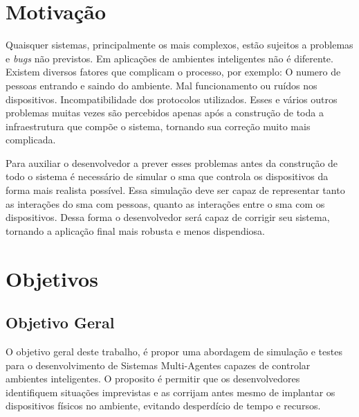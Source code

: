     
    
\section{Motivação}
\label{sec:motivacao}
 
    Quaisquer sistemas, principalmente os mais complexos, estão sujeitos a problemas e \emph{bugs} não previstos. Em aplicações de ambientes inteligentes não é diferente. Existem diversos fatores que complicam o processo, por exemplo: O numero de pessoas entrando e saindo do ambiente. Mal funcionamento ou ruídos nos dispositivos. Incompatibilidade dos protocolos utilizados. Esses e vários outros problemas muitas vezes são percebidos apenas após a construção de toda a infraestrutura que compõe o sistema, tornando sua correção muito mais complicada. 
    
    
    Para auxiliar o desenvolvedor a prever esses problemas antes da construção de todo o sistema é necessário de simular o \acrlong{sma} que controla os dispositivos da forma mais realista possível. Essa simulação deve ser capaz de representar tanto as interações do \acrlong{sma} com pessoas, quanto as interações entre o \acrlong{sma} com os dispositivos. Dessa forma o desenvolvedor será capaz de corrigir seu sistema, tornando a aplicação final mais robusta e menos dispendiosa.

\section{Objetivos}
\label{sec:objetivos}


\subsection{Objetivo Geral}
\label{sec:objetivo-geral}

    O objetivo geral deste trabalho, é propor uma abordagem de simulação e testes para o desenvolvimento de Sistemas Multi-Agentes capazes de controlar ambientes inteligentes. O proposito é permitir que os desenvolvedores identifiquem situações imprevistas e as corrijam antes mesmo de implantar os dispositivos físicos no ambiente, evitando desperdício de tempo e recursos. 

